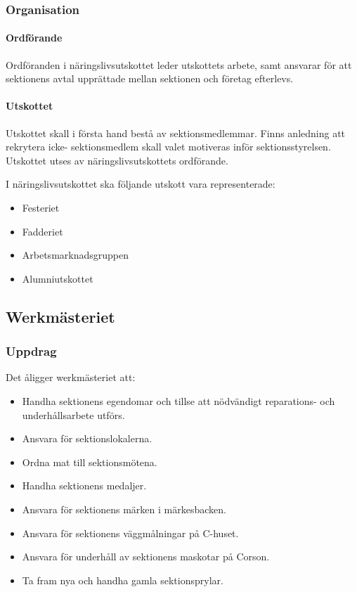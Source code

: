 \documentclass{datateknologsektionen-document}
\begin{document}
\subsubsection{Organisation}
\paragraph{Ordförande}
Ordföranden i näringslivsutskottet leder utskottets arbete, samt ansvarar för att sektionens
avtal upprättade mellan sektionen och företag efterlevs.
\paragraph{Utskottet}

Utskottet skall i första hand bestå av sektionsmedlemmar. Finns anledning att rekrytera icke-
sektionsmedlem skall valet motiveras inför sektionsstyrelsen. Utskottet utses av
näringslivsutskottets ordförande.

I näringslivsutskottet ska följande utskott vara representerade:
\begin{itemize}
  \item Festeriet
  \item Fadderiet
  \item Arbetsmarknadsgruppen
  \item Alumniutskottet
\end{itemize}
\subsection{Werkmästeriet}
\label{werk}
\subsubsection{Uppdrag}
Det åligger werkmästeriet att:
\begin{itemize}
  \item Handha sektionens egendomar och tillse att nödvändigt reparations- och underhållsarbete utförs.
  \item Ansvara för sektionslokalerna.
  \item Ordna mat till sektionsmötena.
  \item Handha sektionens medaljer.
  \item Ansvara för sektionens märken i märkesbacken.
  \item Ansvara för sektionens väggmålningar på C-huset.
  \item Ansvara för underhåll av sektionens maskotar på Corson.
  \item Ta fram nya och handha gamla sektionsprylar.
\end{itemize}
\end{document}
